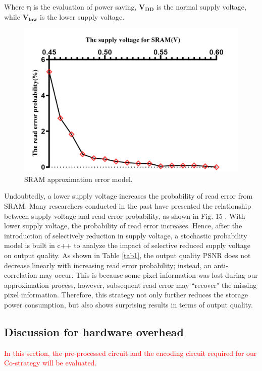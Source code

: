 \documentclass[lettersize,journal]{IEEEtran}
\begin{document}
Where $\boldsymbol{\eta}$  is the evaluation of power saving, $\boldsymbol{V_{DD}}$ is the normal supply voltage, while $\boldsymbol{V_{low}}$ is the lower supply voltage.
\begin{figure}[htb]
\centering
\includegraphics[width=\linewidth]{Fig/SRAM approximation error model.png}
\caption{SRAM approximation error model.}
\label{fig15}
\end{figure}

Undoubtedly, a lower supply voltage increases the probability of read error from SRAM. Many researchers conducted in the past have presented the relationship between supply voltage and read error probability, as shown in Fig. 15 \cite{9371622}. With lower supply voltage, the probability of read error increases. Hence, after the introduction of selectively reduction in supply voltage, a stochastic probability model is built in c++ to analyze the impact of selective reduced supply voltage on output quality. As shown in Table \ref{tab1}, the output quality PSNR does not decrease linearly with increasing read error probability; instead, an anti-correlation may occur. This is because some pixel information was lost during our approximation process, however, subsequent read error may ``recover" the missing pixel information. Therefore, this strategy not only further reduces the storage power consumption, but also shows surprising results in terms of output quality.

{\color{red}\subsection{Discussion for hardware overhead}}
\textcolor{red}{In this section, the pre-processed circuit and the encoding circuit required for our Co-strategy will be evaluated.} 
\end{document}
